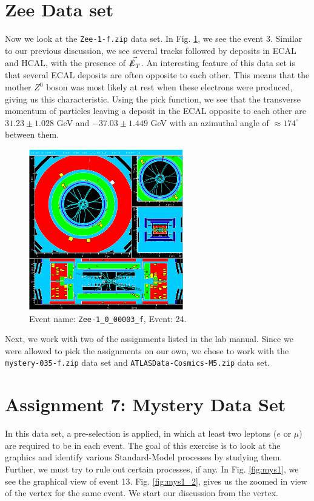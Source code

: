 \documentclass[a4paper]{report}
\numberwithin{equation}{section}
\begin{document}
\section{Zee Data set}

Now we look at the \texttt{Zee-1-f.zip} data set. In Fig. \ref{fig:zee}, we see the event 3. Similar to our previous discussion, we see several tracks followed by deposits in ECAL and HCAL, with the presence of $\vec{\slashed{E}_T}$. An interesting feature of this data set is that several ECAL deposits are often opposite to each other. This means that the mother $Z^0$ boson was most likely at rest when these electrons were produced, giving us this characteristic. Using the pick function, we see that the transverse momentum of particles leaving a deposit in the ECAL opposite to each other are $31.23 \pm 1.028$ GeV and $-37.03 \pm 1.449$ GeV with an azimuthal angle of $\approx 174^{\circ}$ between them. 

\begin{figure}[htpb]
    \centering
    \includegraphics[width=0.6\textwidth]{Zee-1_0_00024_f-YX-RZ-RZ-YX-2022-06-28-02-09-55}
    \caption{Event name: \texttt{Zee-1\_0\_00003\_f}, Event: 24.}
    \label{fig:zee}
\end{figure}


Next, we work with two of the assignments listed in the lab manual. Since we were allowed to pick the assignments on our own, we chose to work with the \texttt{mystery-035-f.zip} data set and \texttt{ATLASData-Cosmics-M5.zip} data set. 

\section{Assignment 7: Mystery Data Set}  \label{subsec:mystery}
In this data set, a pre-selection is applied, in which at least two leptons ($e$ or $\mu$) are required to be in each event. The goal of this exercise is to look at the graphics and identify various Standard-Model processes by studying them. Further, we must try to rule out certain processes, if any. In Fig. \ref{fig:mys1}, we see the graphical view of event 13. Fig. \ref{fig:mys1_2}, gives us the zoomed in view of the vertex for the same event. We start our discussion from the vertex. 
\end{document}
